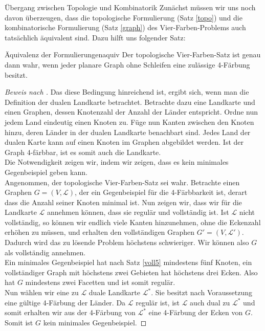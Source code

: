 \begin{chapter}{Übergang zwischen Topologie und Kombinatorik}
 Zunächst müssen wir uns noch davon überzeugen, dass die topologische Formulierung (Satz \ref{topo}) und die kombinatorische Formulierung (Satz \ref{graph}) des Vier-Farben-Problems auch tatsächlich äquivalent sind. Dazu hilft uns folgender Satz:
 
 \begin{satzl}{Äquivalenz der Formulierungen}{aquiv}
  Der topologische Vier-Farben-Satz ist genau dann wahr, wenn jeder planare Graph ohne Schleifen eine zulässige 4-Färbung besitzt.
 \end{satzl}
 
 \begin{proof}[Beweis nach \cite{fritsch}]
  Das diese Bedingung hinreichend ist, ergibt sich, wenn man die Definition der dualen Landkarte betrachtet. Betrachte dazu eine Landkarte und einen Graphen, dessen Knotenzahl der Anzahl der Länder entspricht. Ordne nun jedem Land eindeutig einen Knoten zu. Füge nun Kanten zwischen den Knoten hinzu, deren Länder in der dualen Landkarte benachbart sind. Jedes Land der dualen Karte kann auf einen Knoten im Graphen abgebildet werden. Ist der Graph 4-färbbar, ist es somit auch die Landkarte.\\
  Die Notwendigkeit zeigen wir, indem wir zeigen, dass es kein minimales Gegenbeispiel geben kann.\\
  Angenommen, der topologische Vier-Farben-Satz sei wahr. Betrachte einen Graphen $G=(V,\mathcal{L})$, der ein Gegenbeispiel für die 4-Färbbarkeit ist, derart dass die Anzahl seiner Knoten minimal ist. Nun zeigen wir, dass wir für die Landkarte $\mathcal{L}$ annehmen können, dass sie regulär und vollständig ist. Ist $\mathcal{L}$ nicht vollständig, so können wir endlich viele Kanten hinzunehmen, ohne die Eckenzahl erhöhen zu müssen, und erhalten den vollständigen Graphen $G' = (V,\mathcal{L}')$. Dadurch wird das zu lösende Problem höchstens schwieriger. Wir können also $G$ als vollständig annehmen. \\
  Ein minimales Gegenbeispiel hat nach Satz \ref{voll5} mindestens fünf Knoten, ein vollständiger Graph mit höchstens zwei Gebieten hat höchstens drei Ecken. Also hat $G$ mindestens zwei Facetten und ist somit regulär.\\
  Nun wählen wir eine zu $\mathcal{L}$ duale Landkarte $\mathcal{L}^*$. Sie besitzt nach Voraussetzung eine gültige 4-Färbung der Länder. Da $\mathcal{L}$ regulär ist, ist $\mathcal{L}$ auch dual zu $\mathcal{L}^*$ und somit erhalten wir aus der 4-Färbung von $\mathcal{L}^*$ eine 4-Färbung der Ecken von $G$. Somit ist $G$ kein minimales Gegenbeispiel.
 \end{proof}

\end{chapter}